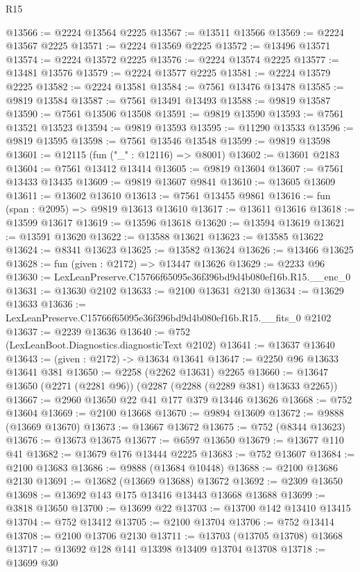 \begin{lexlean}{R15}
\begin{coremodule}
@13566 := @2224 @13564 @2225
@13567 := @13511 @13566
@13569 := @2224 @13567 @2225
@13571 := @2224 @13569 @2225
@13572 := @13496 @13571
@13574 := @2224 @13572 @2225
@13576 := @2224 @13574 @2225
@13577 := @13481 @13576
@13579 := @2224 @13577 @2225
@13581 := @2224 @13579 @2225
@13582 := @2224 @13581
@13584 := @7561 @13476 @13478
@13585 := @9819 @13584
@13587 := @7561 @13491 @13493
@13588 := @9819 @13587
@13590 := @7561 @13506 @13508
@13591 := @9819 @13590
@13593 := @7561 @13521 @13523
@13594 := @9819 @13593
@13595 := @11290 @13533
@13596 := @9819 @13595
@13598 := @7561 @13546 @13548
@13599 := @9819 @13598
@13601 := @12115 (fun ("_" : @12116) => @8001)
@13602 := @13601 @2183
@13604 := @7561 @13412 @13414
@13605 := @9819 @13604
@13607 := @7561 @13433 @13435
@13609 := @9819 @13607 @9841
@13610 := @13605 @13609
@13611 := @13602 @13610
@13613 := @7561 @13455 @9861
@13616 := fun (span : @2095) => @9819 @13613 @13610
@13617 := @13611 @13616
@13618 := @13599 @13617
@13619 := @13596 @13618
@13620 := @13594 @13619
@13621 := @13591 @13620
@13622 := @13588 @13621
@13623 := @13585 @13622
@13624 := @8341 @13623
@13625 := @13582 @13624
@13626 := @13466 @13625
@13628 := fun (given : @2172) => @13447 @13626
@13629 := @2233 @96
@13630 := LexLeanPreserve.C15766f65095e36f396bd9d4b080ef16b.R15.__enc_0
@13631 := @13630 @2102
@13633 := @2100 @13631 @2130
@13634 := @13629 @13633
@13636 := LexLeanPreserve.C15766f65095e36f396bd9d4b080ef16b.R15.__fits_0 @2102
@13637 := @2239 @13636
@13640 := @752 (LexLeanBoot.Diagnostics.diagnosticText @2102)
@13641 := @13637 @13640
@13643 := (given : @2172) -> @13634 @13641
@13647 := @2250 @96 @13633 @13641 @381
@13650 := @2258 (@2262 @13631) @2265
@13660 := @13647 @13650 (@2271 (@2281 @96)) (@2287 (@2288 (@2289 @381) @13633 @2265))
@13667 := @2960 @13650 @22 @41 @177 @379 @13446 @13626
@13668 := @752 @13604
@13669 := @2100 @13668
@13670 := @9894 @13609
@13672 := @9888 (@13669 @13670)
@13673 := @13667 @13672
@13675 := @752 (@8344 @13623)
@13676 := @13673 @13675
@13677 := @6597 @13650
@13679 := @13677 @110 @41
@13682 := @13679 @176 @13444 @2225
@13683 := @752 @13607
@13684 := @2100 @13683
@13686 := @9888 (@13684 @10448)
@13688 := @2100 @13686 @2130
@13691 := @13682 (@13669 @13688) @13672
@13692 := @2309 @13650
@13698 := @13692 @143 @175 @13416 @13443 @13668 @13688
@13699 := @3818 @13650
@13700 := @13699 @22
@13703 := @13700 @142 @13410 @13415
@13704 := @752 @13412
@13705 := @2100 @13704
@13706 := @752 @13414
@13708 := @2100 @13706 @2130
@13711 := @13703 (@13705 @13708) @13668
@13717 := @13692 @128 @141 @13398 @13409 @13704 @13708
@13718 := @13699 @30

\end{coremodule}
\end{lexlean}
